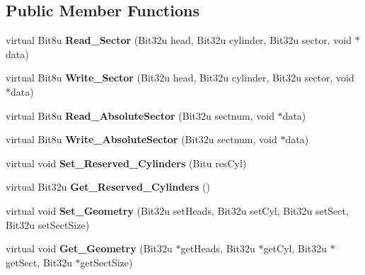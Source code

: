 \subsection*{Public Member Functions}
\begin{DoxyCompactItemize}
\item 
\hypertarget{classimageDisk_a7ea6d269da665272292e52edd12daa1f}{virtual Bit8u {\bfseries Read\-\_\-\-Sector} (Bit32u head, Bit32u cylinder, Bit32u sector, void $\ast$data)}\label{classimageDisk_a7ea6d269da665272292e52edd12daa1f}

\item 
\hypertarget{classimageDisk_a3e522e4d87c8e36541da53cef10cefd7}{virtual Bit8u {\bfseries Write\-\_\-\-Sector} (Bit32u head, Bit32u cylinder, Bit32u sector, void $\ast$data)}\label{classimageDisk_a3e522e4d87c8e36541da53cef10cefd7}

\item 
\hypertarget{classimageDisk_abbe14abad56b09e8f9abb76d032efb92}{virtual Bit8u {\bfseries Read\-\_\-\-Absolute\-Sector} (Bit32u sectnum, void $\ast$data)}\label{classimageDisk_abbe14abad56b09e8f9abb76d032efb92}

\item 
\hypertarget{classimageDisk_acb9db93f59a047de17de2333c20089d1}{virtual Bit8u {\bfseries Write\-\_\-\-Absolute\-Sector} (Bit32u sectnum, void $\ast$data)}\label{classimageDisk_acb9db93f59a047de17de2333c20089d1}

\item 
\hypertarget{classimageDisk_a77c182bbcbb8d939eb8cdc00c83284f0}{virtual void {\bfseries Set\-\_\-\-Reserved\-\_\-\-Cylinders} (Bitu res\-Cyl)}\label{classimageDisk_a77c182bbcbb8d939eb8cdc00c83284f0}

\item 
\hypertarget{classimageDisk_a035e20bedbd7761be7c22555c15cfc78}{virtual Bit32u {\bfseries Get\-\_\-\-Reserved\-\_\-\-Cylinders} ()}\label{classimageDisk_a035e20bedbd7761be7c22555c15cfc78}

\item 
\hypertarget{classimageDisk_a508518d2faaf105d79b054ee07431f77}{virtual void {\bfseries Set\-\_\-\-Geometry} (Bit32u set\-Heads, Bit32u set\-Cyl, Bit32u set\-Sect, Bit32u set\-Sect\-Size)}\label{classimageDisk_a508518d2faaf105d79b054ee07431f77}

\item 
\hypertarget{classimageDisk_a3ba5b3c97aac1cf084f8307416be3d3f}{virtual void {\bfseries Get\-\_\-\-Geometry} (Bit32u $\ast$get\-Heads, Bit32u $\ast$get\-Cyl, Bit32u $\ast$get\-Sect, Bit32u $\ast$get\-Sect\-Size)}\label{classimageDisk_a3ba5b3c97aac1cf084f8307416be3d3f}


\end{DoxyCompactItemize}
